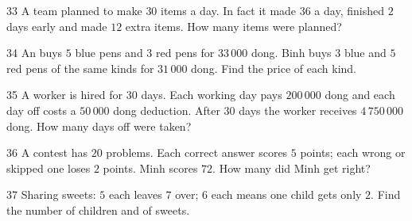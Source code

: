 \gap
\begin{probbox}{33}{}
A team planned to make $30$ items a day. In fact it made $36$ a day, finished $2$ days early and made $12$ extra items. How many items were planned?
\end{probbox}
\gap
\begin{probbox}{34}{}
An buys $5$ blue pens and $3$ red pens for $33\,000$ dong. Binh buys $3$ blue and $5$ red pens of the same kinds for $31\,000$ dong. Find the price of each kind.
\end{probbox}
\gap
\begin{probbox}{35}{}
A worker is hired for $30$ days. Each working day pays $200\,000$ dong and each day off costs a $50\,000$ dong deduction. After $30$ days the worker receives $4\,750\,000$ dong. How many days off were taken?
\end{probbox}
\gap
\begin{probbox}{36}{}
A contest has $20$ problems. Each correct answer scores $5$ points; each wrong or skipped one loses $2$ points. Minh scores $72$. How many did Minh get right?
\end{probbox}
\gap
\begin{probbox}{37}{}
Sharing sweets: $5$ each leaves $7$ over; $6$ each means one child gets only $2$. Find the number of children and of sweets.
\end{probbox}
